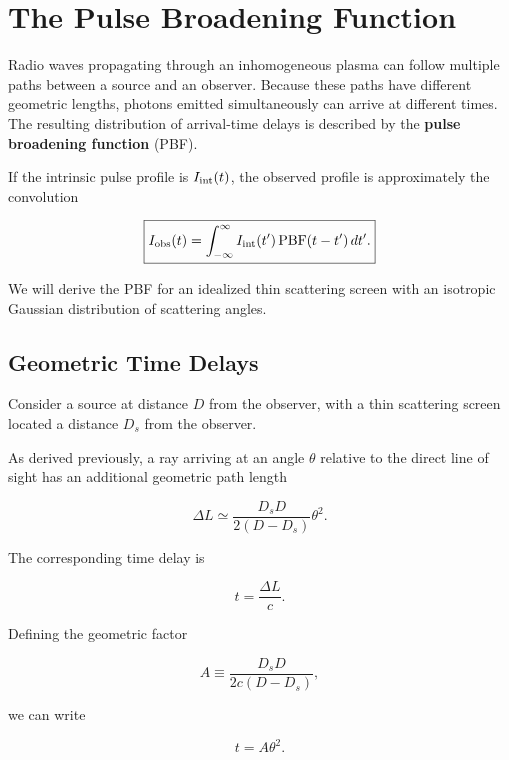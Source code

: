 
\section{The Pulse Broadening Function}
\label{sec:pulse_broadening_function}

Radio waves propagating through an inhomogeneous plasma can
follow multiple paths between a source and an observer.
Because these paths have different geometric lengths, photons
emitted simultaneously can arrive at different times.
The resulting distribution of arrival-time delays is
described by the \textbf{pulse broadening function} (PBF).

If the intrinsic pulse profile is $I_{\rm int}(t)$,
the observed profile is approximately the convolution

\begin{equation}
\boxed{
I_{\rm obs}(t)
=
\int_{-\infty}^{\infty}
I_{\rm int}(t')\,\mathrm{PBF}(t-t')\,dt'.
}
\end{equation}

We will derive the PBF for an idealized thin scattering
screen with an isotropic Gaussian distribution of
scattering angles.

\subsection{Geometric Time Delays}

Consider a source at distance $D$ from the observer,
with a thin scattering screen located a distance $D_s$
from the observer.

As derived previously, a ray arriving at an angle
$\theta$ relative to the direct line of sight
has an additional geometric path length

\begin{equation}
\Delta L
\simeq
\frac{D_sD}{2(D-D_s)}\theta^2.
\end{equation}

The corresponding time delay is

\begin{equation}
t=\frac{\Delta L}{c}.
\end{equation}

Defining the geometric factor

\begin{equation}
A\equiv
\frac{D_sD}{2c(D-D_s)},
\end{equation}

we can write

\begin{equation}
\boxed{t=A\theta^2.}
\end{equation}

